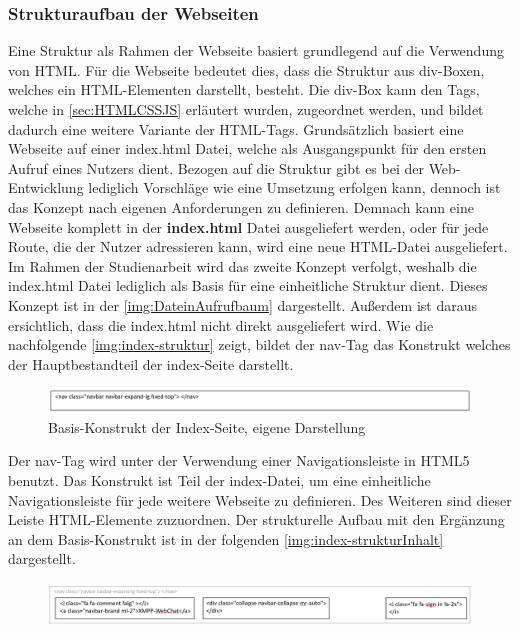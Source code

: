 \documentclass[a4paper,titlepage,halfparskip,12pt]{scrreprt}
\begin{document}
\begin{onehalfspacing}
\subsubsection*{Strukturaufbau der Webseiten}
\label{subsubsec: StrukturaufbauWebseiten}
Eine Struktur als Rahmen der Webseite basiert grundlegend auf die Verwendung von \ac{HTML}. Für die Webseite bedeutet dies, dass die Struktur aus div-Boxen, welches ein \ac{HTML}-Elementen darstellt, besteht. Die div-Box kann den Tags, welche in \autoref{sec:HTMLCSSJS} erläutert wurden, zugeordnet werden, und bildet dadurch eine weitere Variante der \ac{HTML}-Tags. Grundsätzlich basiert eine Webseite auf einer index.html Datei, welche als Ausgangspunkt für den ersten Aufruf eines Nutzers dient. Bezogen auf die Struktur gibt es bei der Web-Entwicklung lediglich Vorschläge wie eine Umsetzung erfolgen kann, dennoch ist das Konzept nach eigenen Anforderungen zu definieren. Demnach kann eine Webseite komplett in der \textbf{index.html} Datei ausgeliefert werden, oder für jede Route, die der Nutzer adressieren kann, wird eine neue \ac{HTML}-Datei ausgeliefert. Im Rahmen der Studienarbeit wird das zweite Konzept verfolgt, weshalb die index.html Datei lediglich als Basis für eine einheitliche Struktur dient. Dieses Konzept ist in der \autoref{img:DateinAufrufbaum} dargestellt. Außerdem ist daraus ersichtlich, dass die index.html nicht direkt ausgeliefert wird. Wie die nachfolgende \autoref{img:index-struktur} zeigt, bildet der nav-Tag das Konstrukt welches der Hauptbestandteil der index-Seite darstellt.
\begin{figure}[h]
	\centering
	\includegraphics[width=\linewidth]{images/indexbody}
	\caption{Basis-Konstrukt der Index-Seite, eigene Darstellung}
	\label{img:index-struktur}
\end{figure}
Der nav-Tag wird unter der Verwendung einer Navigationsleiste in HTML5 benutzt. Das Konstrukt ist Teil der index-Datei, um eine einheitliche Navigationsleiste für jede weitere Webseite zu definieren. Des Weiteren sind dieser Leiste HTML-Elemente zuzuordnen. Der strukturelle Aufbau mit den Ergänzung an dem Basis-Konstrukt ist in der folgenden \autoref{img:index-strukturInhalt} dargestellt.
\begin{figure}[h]
	\centering
	\includegraphics[width=\linewidth]{images/indexbodyInhalt}

\end{figure}
\end{onehalfspacing}
\end{document}
